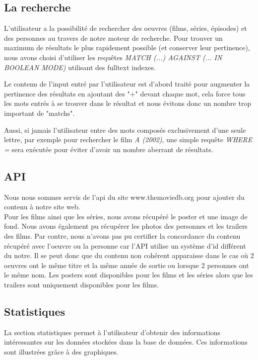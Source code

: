 \documentclass[10pt,a4paper]{article}
\begin{document}
\subsection{La recherche}

L'utilisateur a la possibilité de rechercher des oeuvres (films, séries, épisodes) et des personnes au travers de notre moteur de recherche. Pour trouver un maximum de résultats le plus rapidement possible (et conserver leur pertinence), nous avons choisi d'utiliser les requêtes \textit{MATCH (...) AGAINST (... IN BOOLEAN MODE)} utilisant des fulltext indexes. 
\par 
Le contenu de l'input entré par l'utilisateur est d'abord traité pour augmenter la pertinence des résultats en ajoutant des "+" devant chaque mot, cela force tous les mots entrés à se trouver dans le résultat et nous évitons donc un nombre trop important de "matchs".
\par
Aussi, si jamais l'utilisateur entre des mots composés exclusivement d'une seule lettre, par exemple pour rechercher le film \textit{A (2002)}, une simple requête \textit{WHERE = }
sera exécutée pour éviter d'avoir un nombre aberrant de résultats.

\subsection{API}
Nous nous sommes servis de l'api du site www.themoviedb.org pour ajouter du contenu à notre site web. \\
Pour les films ainsi que les séries, nous avons récupéré le poster et une image de fond. Nous avons également pu récupérer les photos des personnes et les trailers des films. Par contre, nous n'avons pas pu certifier la concordance du contenu récupéré avec l'oeuvre ou la personne car l'API utilise un système d'id différent du notre. Il se peut donc que du contenu non cohérent apparaisse dans le cas où 2 oeuvres ont le même titre et la même année de sortie ou lorsque 2 personnes ont le même nom. Les posters sont disponibles pour les films et les séries alors que les trailers sont uniquement disponibles pour les films.

\newpage
\subsection{Statistiques}
La section statistiques permet à l'utilisateur d'obtenir des informations intéressantes sur les données stockées dans la base de données. Ces informations sont illustrées grâce à des graphiques. \\
\end{document}
